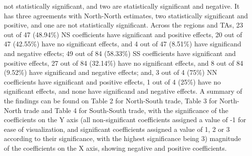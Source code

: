 not statistically significant, and two are statistically significant and
negative. It has three agreements with North-North estimates, two
statistically significant and positive, and one are not statistically
significant. Across the regions and TAs, 23 out of 47 (48.94\%) NS
coefficients have significant and positive effects, 20 out of 47
(42.55\%) have no significant effects, and 4 out of 47 (8.51\%) have
significand and negative effects; 49 out of 84 (58.33\%) SS coefficients
have significant and positive effects, 27 out of 84 (32.14\%) have no
significant effects, and 8 out of 84 (9.52\%) have significand and
negative effects; and, 3 out of 4 (75\%) NN coefficients have
significant and positive effects, 1 out of 4 (25\%) have no significant
effects, and none have significand and negative effects. A summary of
the findings can be found on Table 2 for North-South trade, Table 3 for
North-North trade and Table 4 for South-South trade, with the
significance of the coefficients on the Y axis (all non-significant
coefficients assigned a value of -1 for ease of visualization, and
significant coefficients assigned a value of 1, 2 or 3 according to
their significance, with the highest significance being 3) magnitude of
the coefficients on the X axis, showing negative and positive
coefficients.
